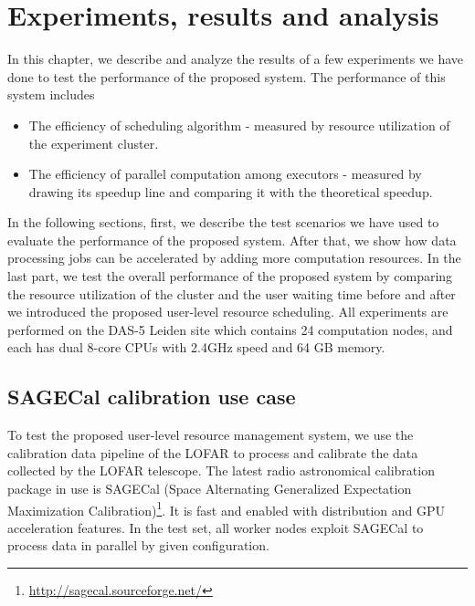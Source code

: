 
\chapter{Experiments, results and analysis } %



\ifpdf
    \graphicspath{{4_analysis&results/figures/PNG/}{4_analysis&results/figures/PDF/}{4_analysis&results/figures/}}
\else
    \graphicspath{{4_analysis&results/figures/EPS/}{4_analysis&results/figures/}}
\fi


% 
In this chapter, we describe and analyze the results of a few experiments we have done to test the performance of the proposed system. 
The performance of this system includes
\begin{itemize}
  \item The efficiency of scheduling algorithm - measured by resource utilization of the experiment cluster.
  \item The efficiency of parallel computation among executors - measured by drawing its speedup line and comparing it with the theoretical speedup.
\end{itemize}

In the following sections, first, we describe the test scenarios we have used to evaluate the performance of the proposed system.
After that, we show how data processing jobs can be accelerated by adding more computation resources.
In the last part, we test the overall performance of the proposed system by comparing the resource utilization of the cluster and the user waiting time before and after we introduced the proposed user-level resource scheduling.
All experiments are performed on the DAS-5 Leiden site which contains 24 computation nodes, and each has dual 8-core CPUs with 2.4GHz speed and 64 GB memory.

\section{SAGECal calibration use case}
To test the proposed user-level resource management system, we use the calibration data pipeline of the LOFAR to process and calibrate the data collected by the LOFAR telescope. 
The latest radio astronomical calibration package in use is SAGECal (Space Alternating Generalized Expectation Maximization Calibration)\footnote{\url{http://sagecal.sourceforge.net/}}.
It is fast and enabled with distribution and GPU acceleration features.
In the test set, all worker nodes exploit SAGECal to process data in parallel by given configuration.

